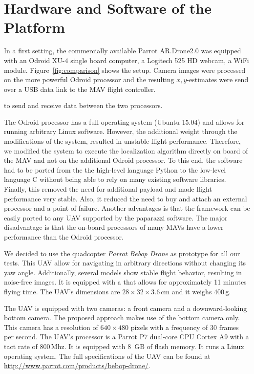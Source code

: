 \DeclareMathOperator*{\argmin}{arg\,min}
\DeclareMathOperator*{\argmax}{arg\,max}

\section{Hardware and Software of the Platform}
\label{sec:hardware}

In a first setting, the commercially available Parrot AR.Drone2.0 was
equipped with an Odroid XU-4 single board computer, a Logitech 525 HD
webcam, a WiFi module. Figure~\ref{fig:comparison} shows the setup. Camera images were processed on the more powerful Odroid processor and the resulting $x,y$-estimates were send over a USB data link to the MAV flight controller. 

to send and receive data between
the two processors.

The Odroid processor has a full operating system (Ubuntu 15.04) and
allows for running arbitrary Linux software.
However, the additional weight through the modifications of the system, resulted in unstable flight performance. Therefore, we modified the system to execute the localization algorithm directly on board of the MAV
and not on the additional Odroid processor. To this end, the software had to be ported from the the high-level language
Python to the low-level language C without being able to rely on many
existing software libraries.
Finally, this removed the need for additional payload and made flight performance
very stable. Also, it reduced the need to buy and attach an external
processor and a point of failure. Another advantages is that the
framework can be easily ported to any UAV supported by the paparazzi
software. The major disadvantage is that the on-board processors of many
MAVs have a lower performance than the Odroid processor.

We decided to use the quadcopter \emph{Parrot Bebop Drone}
as prototype for all our tests. This UAV allow for navigating in
arbitrary directions without changing its yaw angle. Additionally,
several models show stable flight behavior, resulting in noise-free
images. It is equipped with a that allows for approximately 11 minutes
flying time. The UAV's dimensions are $28 \times 32 \times 3.6$\,cm
and it weighs 400\,g.

The UAV is equipped with two cameras: a front camera and a
downward-looking bottom camera. The proposed approach makes use of the
bottom camera only. This camera has a resolution of $640 \times 480$
pixels with a frequency of 30 frames per second. The UAV's processor
is a Parrot P7 dual-core CPU Cortex A9 with a tact rate of
800\,Mhz. It is equipped with 8~GB of flash memory. It runs a Linux
operating system. The full specifications of the UAV can be found at
\url{http://www.parrot.com/products/bebop-drone/}.

